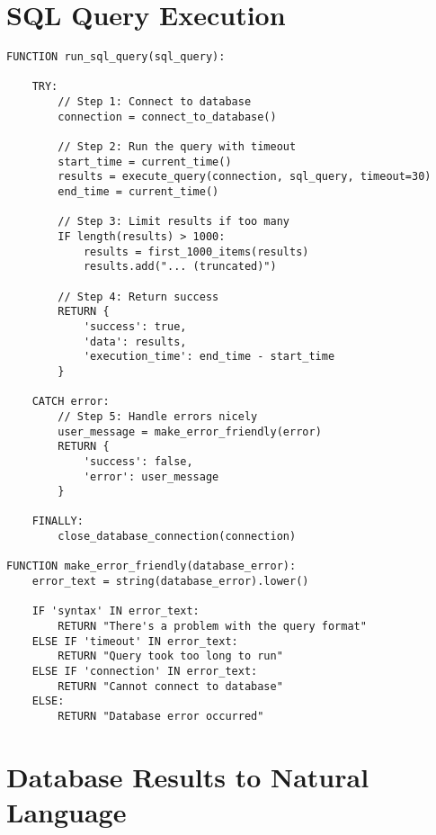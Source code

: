 \section*{SQL Query Execution}

\begin{verbatim}
FUNCTION run_sql_query(sql_query):
    
    TRY:
        // Step 1: Connect to database
        connection = connect_to_database()
        
        // Step 2: Run the query with timeout
        start_time = current_time()
        results = execute_query(connection, sql_query, timeout=30)
        end_time = current_time()
        
        // Step 3: Limit results if too many
        IF length(results) > 1000:
            results = first_1000_items(results)
            results.add("... (truncated)")
        
        // Step 4: Return success
        RETURN {
            'success': true,
            'data': results,
            'execution_time': end_time - start_time
        }
    
    CATCH error:
        // Step 5: Handle errors nicely
        user_message = make_error_friendly(error)
        RETURN {
            'success': false,
            'error': user_message
        }
    
    FINALLY:
        close_database_connection(connection)

FUNCTION make_error_friendly(database_error):
    error_text = string(database_error).lower()
    
    IF 'syntax' IN error_text:
        RETURN "There's a problem with the query format"
    ELSE IF 'timeout' IN error_text:
        RETURN "Query took too long to run"
    ELSE IF 'connection' IN error_text:
        RETURN "Cannot connect to database"
    ELSE:
        RETURN "Database error occurred"
\end{verbatim}

\section*{Database Results to Natural Language}

